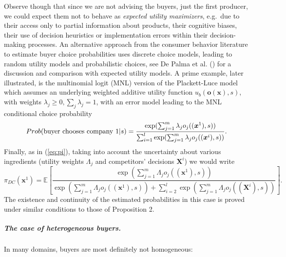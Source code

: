 \documentclass[a4paper,fleqn, 11pt]{cas-sc}
\newtheorem{corollary}{Corollary}
\begin{document}
   Observe though that since we are not advising the buyers, just the first producer,
    we could expect them not to behave as \textit{expected utility maximizers}, e.g.\ due to their access only to partial information about products, their cognitive biases, their use of decision heuristics  or implementation errors within their decision-making processes. 
    An alternative approach from the consumer behavior literature \citep{mcfadden1973conditional,train} to estimate buyer choice probabilities 
    uses discrete choice models, leading to random utility 
    models and probabilistic choices, see De Palma et al. (\citeyear{de2008risk}) for 
    a discussion and comparison with expected utility models.    
    A prime example, later illustrated, is the multinomial logit (MNL) version of the Plackett-Luce model \citep{luce59, f5079a1-8ca5-3727-a405-0a82390327b7} which assumes an underlying weighted additive utility function 
    \citep{gonzalez2018utility} $u_b({\bm o} ({\bm x}), s)$,
    with weights $\lambda _j \geq 0, \sum_j \lambda_j=1$,
    with an error 
    model leading to the MNL conditional choice probability
\[ Prob ({\rm buyer \,\, chooses}\,\,{\rm company}\,\,{\rm  1}  | s) =
 \frac{  \exp ( \sum _{j=1}^m \lambda_j o_j (({\bm x}^1),s) ) }
{ \sum_{i=1}^l \exp ( \sum _{j=1}^m \lambda_j o_j (({\bm x}^i),s) ) }. \]
Finally, as in  (\ref{eq:pi}), taking into account the uncertainty about various ingredients 
 (utility weights $\Lambda_j$ and competitors' decisions ${\bm X}^i$)
we would write 
\begin{equation}\label{kkroswell}
\pi_{DC}({\bm x}^1) = \mathbb{E}\left[ 
\frac{  \exp ( \sum _{j=1}^m \Lambda_j o_j (({\bm x}^1),s) ) }
{ \exp ( \sum _{j=1}^m \Lambda_j o_j (({\bm x}^1),s) ) + \sum_{i=2}^l \exp ( \sum _{j=1}^m \Lambda_j o_j (({\bm X}^i),s) ) } \right].  \end{equation}
The existence and continuity of the estimated probabilities in this case is proved under similar conditions to those of Proposition 2.
\subparagraph{{\it The case of heterogeneous buyers.}}
In many domains, buyers are most definitely not homogeneous: 
\end{document}

